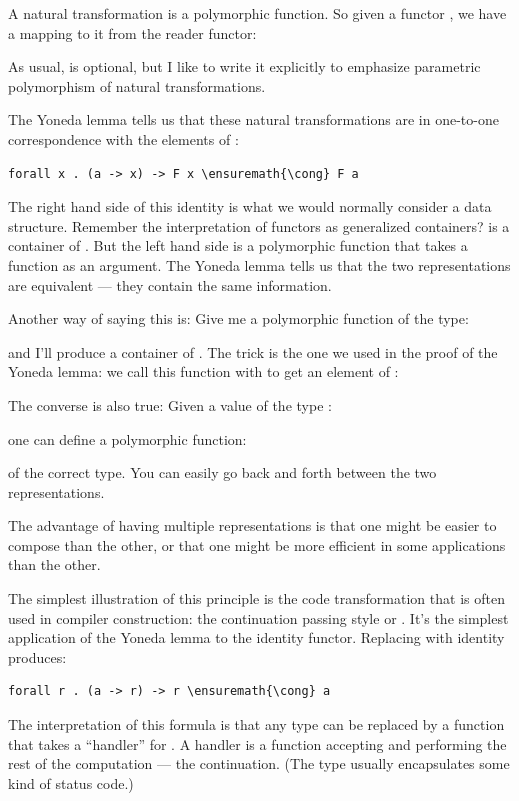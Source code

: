 A natural transformation is a polymorphic function. So given a functor
, we have a mapping to it from the reader functor:

As usual,  is optional, but I like to write it explicitly
to emphasize parametric polymorphism of natural transformations.

The Yoneda lemma tells us that these natural transformations are in
one-to-one correspondence with the elements of :

\begin{Verbatim}[commandchars=\\\{\}]
forall x . (a -> x) -> F x \ensuremath{\cong} F a
\end{Verbatim}
The right hand side of this identity is what we would normally consider
a data structure. Remember the interpretation of functors as generalized
containers?  is a container of . But the left
hand side is a polymorphic function that takes a function as an
argument. The Yoneda lemma tells us that the two representations are
equivalent --- they contain the same information.

Another way of saying this is: Give me a polymorphic function of the
type:

and I'll produce a container of . The trick is the one we used
in the proof of the Yoneda lemma: we call this function with 
to get an element of :

The converse is also true: Given a value of the type :

one can define a polymorphic function:

of the correct type. You can easily go back and forth between the two
representations.

The advantage of having multiple representations is that one might be
easier to compose than the other, or that one might be more efficient in
some applications than the other.

The simplest illustration of this principle is the code transformation
that is often used in compiler construction: the continuation passing
style or . It's the simplest application of the Yoneda lemma to the
identity functor. Replacing  with identity produces:

\begin{Verbatim}[commandchars=\\\{\}]
forall r . (a -> r) -> r \ensuremath{\cong} a
\end{Verbatim}
The interpretation of this formula is that any type  can be
replaced by a function that takes a ``handler'' for . A
handler is a function accepting  and performing the rest of
the computation --- the continuation. (The type  usually
encapsulates some kind of status code.)

